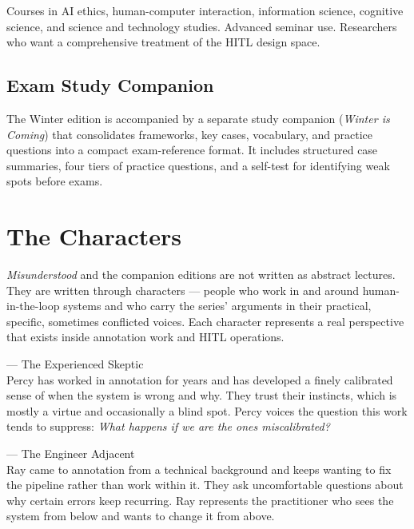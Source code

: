 \documentclass[12pt, a4paper]{article}
\newcommand{\character}[3]{%
  \noindent
  \begin{tcolorbox}[amberstyle, left=8pt, right=8pt, top=5pt, bottom=5pt]
    \noindent{\small\bfseries\sffamily\color{amberdeep} #1}\enspace
    {\footnotesize\color{midgrey}\sffamily — #2}\\[3pt]
    {\small #3}
  \end{tcolorbox}%
  \vspace{4pt}%
}
\begin{document}
\begin{tcolorbox}[editionbox=textbookteal, title=Winter Edition \textbullet\ Academic Course Edition]
Courses in AI ethics, human-computer interaction, information science, cognitive science, and science and technology studies. Advanced seminar use. Researchers who want a comprehensive treatment of the HITL design space.

\subsection*{\color{charcoal} Exam Study Companion}

The Winter edition is accompanied by a separate study companion (\textit{Winter is Coming}) that consolidates frameworks, key cases, vocabulary, and practice questions into a compact exam-reference format. It includes structured case summaries, four tiers of practice questions, and a self-test for identifying weak spots before exams.

\end{tcolorbox}

\newpage

\section{The Characters}

\textit{Misunderstood} and the companion editions are not written as abstract lectures. They are written through characters — people who work in and around human-in-the-loop systems and who carry the series' arguments in their practical, specific, sometimes conflicted voices. Each character represents a real perspective that exists inside annotation work and HITL operations.

\vspace{8pt}

\character{Percy}{The Experienced Skeptic}%
{Percy has worked in annotation for years and has developed a finely calibrated sense of when the system is wrong and why. They trust their instincts, which is mostly a virtue and occasionally a blind spot. Percy voices the question this work tends to suppress: \textit{What happens if we are the ones miscalibrated?}}

\character{Ray}{The Engineer Adjacent}%
{Ray came to annotation from a technical background and keeps wanting to fix the pipeline rather than work within it. They ask uncomfortable questions about why certain errors keep recurring. Ray represents the practitioner who sees the system from below and wants to change it from above.}
\end{document}
